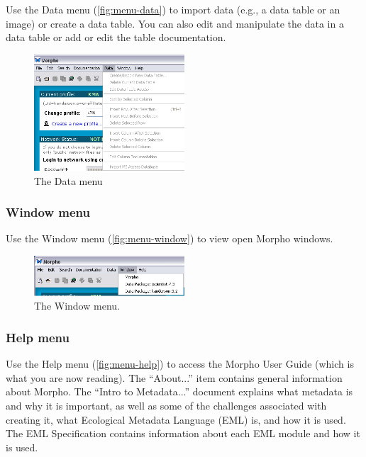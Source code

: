 Use the Data menu (\autoref{fig:menu-data}) to import data (e.g., a data
table or an image) or create a data table. You can also edit and
manipulate the data in a data table or add or edit the table
documentation. 

\begin{figure}
  \centering
    \includegraphics[width=0.5\textwidth]{images/menu-data.jpg}
  \caption{The Data menu}
  \label{fig:menu-data}
\end{figure}

\subsubsection{Window menu} \label{sec:menu-window}

Use the Window menu (\autoref{fig:menu-window}) to view open Morpho
windows. 

\begin{figure}
  \centering
    \includegraphics[width=0.5\textwidth]{images/menu-window.jpg}
  \caption{The Window menu.}
  \label{fig:menu-window}
\end{figure}

\subsubsection{Help menu} \label{sec:menu-help}

Use the Help menu (\autoref{fig:menu-help}) to access the Morpho User
Guide (which is what you are now reading). The ``About...'' item
contains general information about Morpho. The ``Intro to Metadata...''
document explains what metadata is and why it is important, as well as
some of the challenges associated with creating it, what Ecological
Metadata Language (EML) is, and how it is used. The EML Specification
contains information about each EML module and how it is used.

